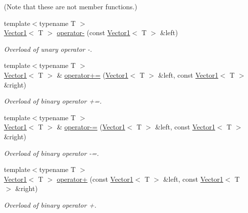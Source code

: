 (Note that these are not member functions.) \begin{DoxyCompactItemize}
\item 
{\footnotesize template$<$typename T $>$ }\\\hyperlink{class_triton_1_1_util_1_1_vector1}{Vector1}$<$ T $>$ \hyperlink{class_triton_1_1_util_1_1_vector1_aaebf92e5156895243d79dd4aba7ef0fd}{operator-\/} (const \hyperlink{class_triton_1_1_util_1_1_vector1}{Vector1}$<$ T $>$ \&left)
\begin{DoxyCompactList}\small\item\em Overload of unary operator -\/. \end{DoxyCompactList}\item 
{\footnotesize template$<$typename T $>$ }\\\hyperlink{class_triton_1_1_util_1_1_vector1}{Vector1}$<$ T $>$ \& \hyperlink{class_triton_1_1_util_1_1_vector1_a56697d34ba8f3f1132471876cb7ba3be}{operator+=} (\hyperlink{class_triton_1_1_util_1_1_vector1}{Vector1}$<$ T $>$ \&left, const \hyperlink{class_triton_1_1_util_1_1_vector1}{Vector1}$<$ T $>$ \&right)
\begin{DoxyCompactList}\small\item\em Overload of binary operator +=. \end{DoxyCompactList}\item 
{\footnotesize template$<$typename T $>$ }\\\hyperlink{class_triton_1_1_util_1_1_vector1}{Vector1}$<$ T $>$ \& \hyperlink{class_triton_1_1_util_1_1_vector1_a2073f04ccc39763a6baad165805d78a2}{operator-\/=} (\hyperlink{class_triton_1_1_util_1_1_vector1}{Vector1}$<$ T $>$ \&left, const \hyperlink{class_triton_1_1_util_1_1_vector1}{Vector1}$<$ T $>$ \&right)
\begin{DoxyCompactList}\small\item\em Overload of binary operator -\/=. \end{DoxyCompactList}\item 
{\footnotesize template$<$typename T $>$ }\\\hyperlink{class_triton_1_1_util_1_1_vector1}{Vector1}$<$ T $>$ \hyperlink{class_triton_1_1_util_1_1_vector1_a6874d414ce5ae0a31cc2891cf212b6c4}{operator+} (const \hyperlink{class_triton_1_1_util_1_1_vector1}{Vector1}$<$ T $>$ \&left, const \hyperlink{class_triton_1_1_util_1_1_vector1}{Vector1}$<$ T $>$ \&right)
\begin{DoxyCompactList}\small\item\em Overload of binary operator +. \end{DoxyCompactList}\item 

\end{DoxyCompactItemize}
